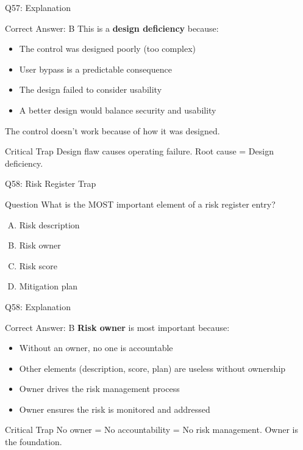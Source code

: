 \documentclass{beamer}
\begin{document}
	\begin{frame}{Q57: Explanation}
		\begin{block}{Correct Answer: B}
			This is a \textbf{design deficiency} because:
			\begin{itemize}
				\item The control was designed poorly (too complex)
				\item User bypass is a predictable consequence
				\item The design failed to consider usability
				\item A better design would balance security and usability
			\end{itemize}
			The control doesn't work because of how it was designed.
		\end{block}
		\begin{alertblock}{Critical Trap}
			Design flaw causes operating failure.
			Root cause = Design deficiency.
		\end{alertblock}
	\end{frame}
	
	\begin{frame}{Q58: Risk Register Trap}
		\begin{block}{Question}
			What is the MOST important element of a risk register entry?
		\end{block}
		\begin{enumerate}[(A)]
			\item Risk description
			\item Risk owner
			\item Risk score
			\item Mitigation plan
		\end{enumerate}
	\end{frame}
	
	\begin{frame}{Q58: Explanation}
		\begin{block}{Correct Answer: B}
			\textbf{Risk owner} is most important because:
			\begin{itemize}
				\item Without an owner, no one is accountable
				\item Other elements (description, score, plan) are useless without ownership
				\item Owner drives the risk management process
				\item Owner ensures the risk is monitored and addressed
			\end{itemize}
		\end{block}
		\begin{alertblock}{Critical Trap}
			No owner = No accountability = No risk management.
			Owner is the foundation.
		\end{alertblock}
	\end{frame}
	
\end{document}
